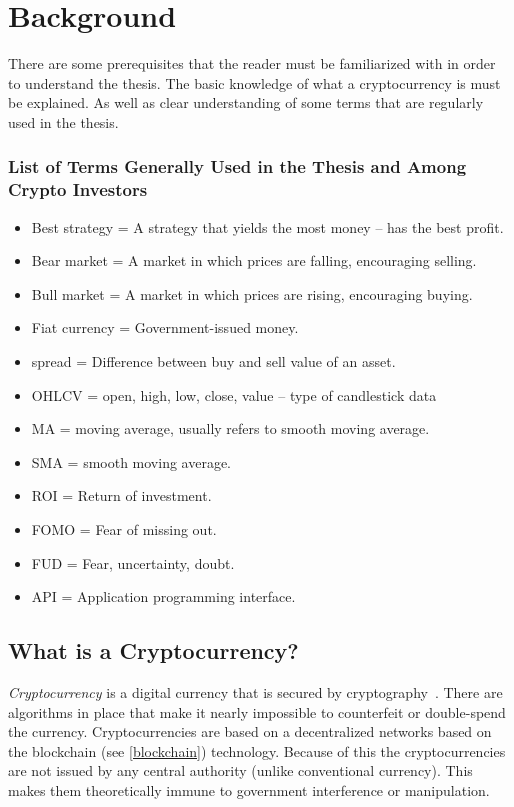 \chapter{Background}
\label{chapter-background}

There are some prerequisites that the reader must be familiarized with in order to understand the thesis. The basic knowledge of what a cryptocurrency is must be explained. As well as clear understanding of some terms that are regularly used in the thesis.

\subsection*{List of Terms Generally Used in the Thesis and Among Crypto Investors}
\begin{itemize}
    \item Best strategy = A strategy that yields the most money -- has the best profit.
    \item Bear market = A market in which prices are falling, encouraging selling.
    \item Bull market = A market in which prices are rising, encouraging buying.
    \item Fiat currency = Government-issued money.
    \item spread = Difference between buy and sell value of an asset.
    \item OHLCV = open, high, low, close, value -- type of candlestick data
    \item MA = moving average, usually refers to smooth moving average.
    \item SMA = smooth moving average.
    \item ROI = Return of investment.
    \item FOMO = Fear of missing out.
    \item FUD = Fear, uncertainty, doubt.
    \item API = Application programming interface.
\end{itemize}

\section{What is a Cryptocurrency?}
\emph{Cryptocurrency} is a digital currency that is secured by cryptography~\cite{investopedia-cryptocurrency}. There are algorithms in place that make it nearly impossible to counterfeit or double-spend the currency. Cryptocurrencies are based on a decentralized networks based on the blockchain (see \ref{blockchain}) technology. Because of this the cryptocurrencies are not issued by any central authority (unlike conventional currency). This makes them theoretically immune to government interference or manipulation.

